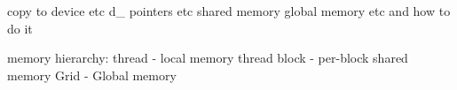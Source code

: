copy to device etc
d\_ pointers etc
shared memory
global memory etc and how to do it

memory hierarchy:
thread - local memory
thread block - per-block shared memory
Grid - Global memory